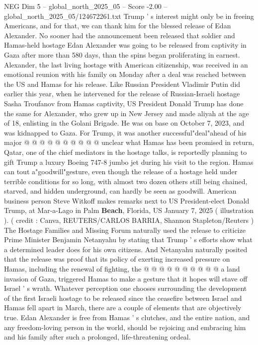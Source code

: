 \begin{textsample}{NEG Dim 5 – global\_north\_2025\_05 – Score -2.00 – global\_north\_2025\_05/124672261.txt}  \label{ex:f5_neg_320}
Trump ' s interest might only be in freeing Americans, and for that, we can thank him for the blessed release of Edan Alexander.
No sooner had the announcement been released that soldier and Hamas-held hostage Edan Alexander was going to be released from captivity in Gaza after more than 580 days, than the spins began proliferating in earnest.
Alexander, the last living hostage with American citizenship, was received in an emotional reunion with his family on Monday after a deal was reached between the US and Hamas for his release.
Like Russian President Vladimir Putin did earlier this year, when he intervened for the release of Russian-Israeli hostage Sasha Troufanov from Hamas captivity, US President Donald Trump has done the same for Alexander, who grew up in New Jersey and made aliyah at the age of 18, enlisting in the Golani Brigade.
He was on base on October 7, 2023, and was kidnapped to Gaza.
For Trump, it was another successful"deal"ahead of his major @ @ @ @ @ @ @ @ @ @ unclear what Hamas has been promised in return, Qatar, one of the chief mediators in the hostage talks, is reportedly planning to gift Trump a luxury Boeing 747-8 jumbo jet during his visit to the region.
Hamas can tout a"goodwill"gesture, even though the release of a hostage held under terrible conditions for so long, with almost two dozen others still being chained, starved, and hidden underground, can hardly be seen as goodwill.
American business person Steve Witkoff makes remarks next to US President-elect Donald Trump, at Mar-a-Lago in Palm \textbf{Beach}, Florida, US January 7, 2025 ( illustration ). ( credit : Canva, REUTERS/CARLOS BARRIA, Shannon Stapleton/Reuters ) The Hostage Families and Missing Forum naturally used the release to criticize Prime Minister Benjamin Netanyahu by stating that Trump ' s efforts show what a determined leader does for his own citizens.
And Netanyahu naturally posited that the release was proof that its policy of exerting increased pressure on Hamas, including the renewal of fighting, the @ @ @ @ @ @ @ @ @ @ a land invasion of Gaza, triggered Hamas to make a gesture that it hopes will stave off Israel ' s wrath.
Whatever perception one chooses surrounding the development of the first Israeli hostage to be released since the ceasefire between Israel and Hamas fell apart in March, there are a couple of elements that are objectively true.
Edan Alexander is free from Hamas ' s clutches, and the entire nation, and any freedom-loving person in the world, should be rejoicing and embracing him and his family after such a prolonged, life-threatening ordeal.

\end{textsample}
